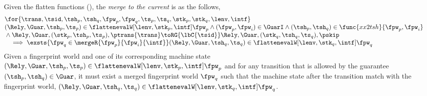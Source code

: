 \begin{lem}
\label{lem:merge-current-sound}
Given the flatten functions (), the \emph{merge to the current} is as the follows,
\[
\begin{array}{@{}l@{}}
    \for{\trans, \tsid, \tsh_{p}, \tsh_{q}, \fpw_{p}, \fpw_{q}, \ts_{p}, \ts_{q}, \stk_{p}, \stk_{q}, \lenv, \intf}  \\
    (\Rely, \Guar, \tsh_{p}, \ts_{p}) \in \flattenevalW[\lenv, \stk_{p}, \intf]{\fpw_{p}}
    \land (\fpw_{p}, \fpw_{i} ) \in \GuarI
    \land (\tsh_{p}, \tsh_{q}) \in \func{xx2tsh}{\fpw_{p}, \fpw_{i}} \\
    {} \land \Rely, \Guar, (\stk_{p}, \tsh_{p}, \ts_{p}), \ptrans{\trans} \toRG{\lbC{\tsid}} \Rely, \Guar, (\stk_{q}, \tsh_{q}, \ts_{q}), \pskip  \\
    \quad \implies \exsts{\fpw_{q} \in \mergeR{\fpw_{p}}{\fpw_{i}}{\intf}}
    (\Rely, \Guar, \tsh_{q}, \ts_{q}) \in \flattenevalW[\lenv, \stk_{q}, \intf]{\fpw_{q}}
\end{array}
\]
Given a fingerprint world  and one of its corresponding machine state \( (\Rely, \Guar, \tsh_{p}, \ts_{p}) \in \flattenevalW[\lenv, \stk_{p}, \intf]{\fpw_{p}} \) and for any transition that is allowed by the guarantee \( (\tsh_{p}, \tsh_{q}) \in \Guar \), it must exist a merged fingerprint world \( \fpw_{q} \) such that the machine state after the transition match with the fingerprint world, \ie \((\Rely, \Guar, \tsh_{q}, \ts_{q}) \in \flattenevalW[\lenv, \stk_{q}, \intf]{\fpw_{q}}\).
\end{lem}
